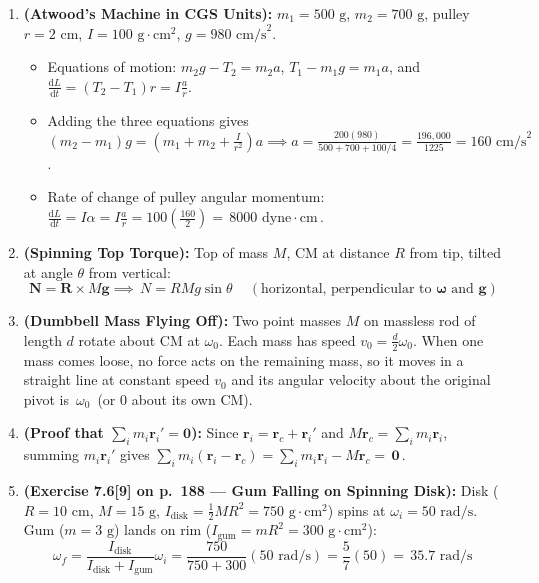 \documentclass[11pt,a4paper,openany,oneside]{book}
\newcommand{\eqbox}[1]{\boxed{\,#1\,}}
\newcommand{\vect}[1]{\mathbf{#1}}
\newcommand{\diff}{\mathrm{d}}
\numberwithin{equation}{chapter}
\begin{document}
\begin{enumerate}[label=\textbf{Ex.\ 7.\arabic*},leftmargin=3.5em]
  \item \textbf{(Atwood's Machine in CGS Units):} $m_1 = 500\text{ g}$, $m_2 = 700\text{ g}$, pulley $r = 2\text{ cm}$, $I = 100\text{ g}\cdot\text{cm}^2$, $g = 980\text{ cm/s}^2$.
  \begin{itemize}
    \item Equations of motion: $m_2 g - T_2 = m_2 a$, $T_1 - m_1 g = m_1 a$, and $\frac{\diff L}{\diff t} = (T_2 - T_1)r = I\frac{a}{r}$.
    \item Adding the three equations gives $(m_2 - m_1)g = \left(m_1 + m_2 + \frac{I}{r^2}\right)a \implies a = \frac{200(980)}{500 + 700 + 100/4} = \frac{196,000}{1225} = 160\text{ cm/s}^2$.
    \item Rate of change of pulley angular momentum: $\frac{\diff L}{\diff t} = I\alpha = I\frac{a}{r} = 100\!\left(\frac{160}{2}\right) = \eqbox{8000\text{ dyne}\cdot\text{cm}}$.
  \end{itemize}

  \item \textbf{(Spinning Top Torque):} Top of mass $M$, CM at distance $R$ from tip, tilted at angle $\theta$ from vertical:
  \begin{equation*}
    \vect{N} = \vect{R}\times M\vect{g} \implies \eqbox{N = RMg\sin\theta} \quad(\text{horizontal, perpendicular to }\bm{\omega}\text{ and }\vect{g})
  \end{equation*}

  \item \textbf{(Dumbbell Mass Flying Off):} Two point masses $M$ on massless rod of length $d$ rotate about CM at $\omega_0$. Each mass has speed $v_0 = \frac{d}{2}\omega_0$. When one mass comes loose, no force acts on the remaining mass, so it moves in a straight line at constant speed $v_0$ and its angular velocity about the original pivot is $\eqbox{\omega_0}$ (or $0$ about its own CM).

  \item \textbf{(Proof that $\sum_i m_i\vect{r}_i' = \vect{0}$):} Since $\vect{r}_i = \vect{r}_c + \vect{r}_i'$ and $M\vect{r}_c = \sum_i m_i\vect{r}_i$, summing $m_i\vect{r}_i'$ gives $\sum_i m_i(\vect{r}_i - \vect{r}_c) = \sum_i m_i\vect{r}_i - M\vect{r}_c = \eqbox{\vect{0}}$.

  \item \textbf{(Exercise 7.6[9] on p.\ 188 --- Gum Falling on Spinning Disk):} Disk ($R = 10\text{ cm}$, $M = 15\text{ g}$, $I_{\text{disk}} = \frac{1}{2}MR^2 = 750\text{ g}\cdot\text{cm}^2$) spins at $\omega_i = 50\text{ rad/s}$. Gum ($m = 3\text{ g}$) lands on rim ($I_{\text{gum}} = mR^2 = 300\text{ g}\cdot\text{cm}^2$):
  \begin{equation*}
    \omega_f = \frac{I_{\text{disk}}}{I_{\text{disk}} + I_{\text{gum}}}\omega_i = \frac{750}{750 + 300}(50\text{ rad/s}) = \frac{5}{7}(50) = \eqbox{35.7\text{ rad/s}}
  \end{equation*}


\end{enumerate}
\end{document}
